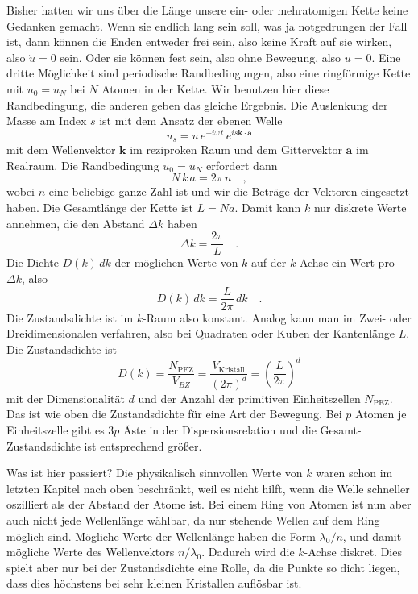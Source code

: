 Bisher hatten wir uns über die Länge unsere ein- oder mehratomigen Kette keine Gedanken gemacht. Wenn sie endlich lang sein soll, was ja notgedrungen der Fall ist, dann können die Enden entweder frei sein, also keine Kraft auf sie wirken, also $\ddot{u} = 0$ sein. Oder sie können fest sein, also ohne Bewegung, also $u=0$. Eine dritte Möglichkeit sind periodische Randbedingungen, also eine ringförmige Kette mit $u_0 = u_N$ bei $N$ Atomen in der Kette. Wir benutzen hier diese Randbedingung, die anderen geben das gleiche Ergebnis. Die Auslenkung der Masse am Index $s$ ist mit dem Ansatz der ebenen Welle
\begin{equation}
 u_s = u \, e^{- i \omega \, t} \, e^{i s \mathbf{k} \cdot \mathbf{a}}
\end{equation}
mit dem Wellenvektor $\mathbf{k} $ im reziproken Raum und dem Gittervektor $\mathbf{a}$ im  Realraum. Die Randbedingung $u_0 = u_N$ erfordert dann
\begin{equation}
 N \, k \, a = 2 \pi \, n \quad ,
\end{equation}
wobei $n$ eine beliebige ganze Zahl ist und wir die Beträge der Vektoren eingesetzt haben.
Die Gesamtlänge der Kette ist $L = N a$. Damit kann $k$ nur diskrete Werte annehmen, die den Abstand $\Delta k$ haben
\begin{equation}
\Delta  k = \frac{2 \pi }{L}  \quad .
\end{equation}
Die Dichte $ D(k) \, dk$ der möglichen Werte von $k$ auf der $k$-Achse ein Wert pro $\Delta k$, also
\begin{equation}
 D(k) \, dk = \frac{L}{2 \pi} \, dk  \quad .
\end{equation}
Die Zustandsdichte ist im $k$-Raum also konstant.
Analog kann man im Zwei- oder Dreidimensionalen verfahren, also bei Quadraten oder Kuben der Kantenlänge $L$. Die Zustandsdichte ist
\begin{equation}
D(k) = \frac{N_\text{PEZ}}{V_{BZ}}  = 
\frac{V_\text{Kristall}} {(2 \pi)^d} =
 \left(\frac{L}{2 \pi} \right)^d 
\end{equation}
mit der Dimensionalität $d$ und der Anzahl der primitiven Einheitszellen $N_\text{PEZ}$. Das ist wie oben die Zustandsdichte für eine Art der Bewegung. Bei $p$ Atomen je Einheitszelle gibt es $3p$ Äste in der Dispersionsrelation und die Gesamt-Zustandsdichte ist entsprechend größer.

Was ist hier passiert? Die physikalisch sinnvollen Werte von $k$ waren schon im letzten Kapitel nach oben beschränkt, weil es nicht hilft, wenn die Welle schneller oszilliert als der Abstand der Atome ist. Bei einem Ring von Atomen ist nun aber auch nicht jede Wellenlänge wählbar, da nur stehende Wellen auf dem Ring möglich sind. Mögliche Werte der Wellenlänge haben die Form $\lambda_0 / n$, und damit mögliche Werte des Wellenvektors $n / \lambda_0$. Dadurch wird die $k$-Achse diskret. Dies spielt aber nur bei der Zustandsdichte eine Rolle, da die Punkte so dicht liegen, dass dies höchstens bei sehr kleinen Kristallen auflösbar ist.

